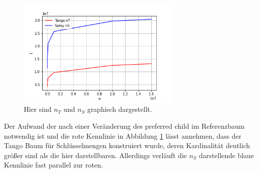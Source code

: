 \documentclass[a4paper,12pt]{article}
\begin{document}
\begin{figure}[H]
	\centering
	\includegraphics[width=0.7\textwidth]{Medien/laufzeittest/diagramm/nT}
	\caption{Hier sind $n_T$ und $n_S$ graphisch dargestellt.}
	\label{fig:nT}
\end{figure}
\noindent Der Aufwand der nach einer Veränderung des preferred child im Referenzbaum notwendig ist und die rote Kennlinie in Abbildung \ref{fig:nT} lässt annehmen, dass der Tango Baum für Schlüsselmengen konstruiert wurde, deren Kardinalität deutlich größer sind als die hier darstellbaren. Allerdings verläuft die $n_S$ darstellende blaue Kennlinie fast parallel zur roten.      
\end{document}

